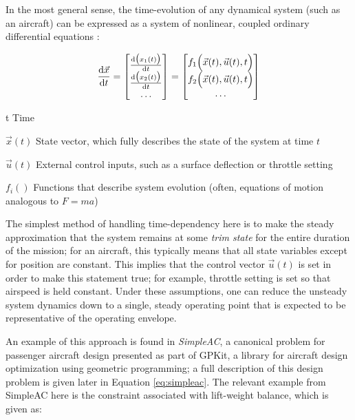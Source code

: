 In the most general sense, the time-evolution of any dynamical system (such as an aircraft) can be expressed as a system of nonlinear, coupled ordinary differential equations \cite{Betts2009}:

\begin{equation}
    \frac{\mathrm{d} \vec{x}}{\mathrm{d} t} =
    \begin{bmatrix}
        \frac{\mathrm{d} \big(x_1(t)\big)}{\mathrm{d} t} \\
        \frac{\mathrm{d} \big(x_2(t)\big)}{\mathrm{d} t} \\
        \dots \\
    \end{bmatrix} =
    \begin{bmatrix}
        f_1\Big(\vec{x}(t), \vec{u}(t), t\Big) \\
        f_2\Big(\vec{x}(t), \vec{u}(t), t\Big) \\
        \dots \\
    \end{bmatrix}
    \label{eq:ode}
\end{equation}

\begin{eqexpl}
    \item{t} Time
    \item{$\vec{x}(t)$} State vector, which fully describes the state of the system at time $t$
    \item{$\vec{u}(t)$} External control inputs, such as a surface deflection or throttle setting
    \item{$f_i()$} Functions that describe system evolution (often, equations of motion analogous to $F=ma$)
\end{eqexpl}

The simplest method of handling time-dependency here is to make the steady approximation that the system remains at some \textit{trim state} for the entire duration of the mission; for an aircraft, this typically means that all state variables except for position are constant. This implies that the control vector $\vec{u}(t)$ is set in order to make this statement true; for example, throttle setting is set so that airspeed is held constant. Under these assumptions, one can reduce the unsteady system dynamics down to a single, steady operating point that is expected to be representative of the operating envelope.

An example of this approach is found in \textit{SimpleAC}, a canonical problem for passenger aircraft design presented as part of GPKit, a library for aircraft design optimization using geometric programming; a full description of this design problem is given later in Equation \ref{eq:simpleac}. The relevant example from SimpleAC here is the constraint associated with lift-weight balance, which is given as:

